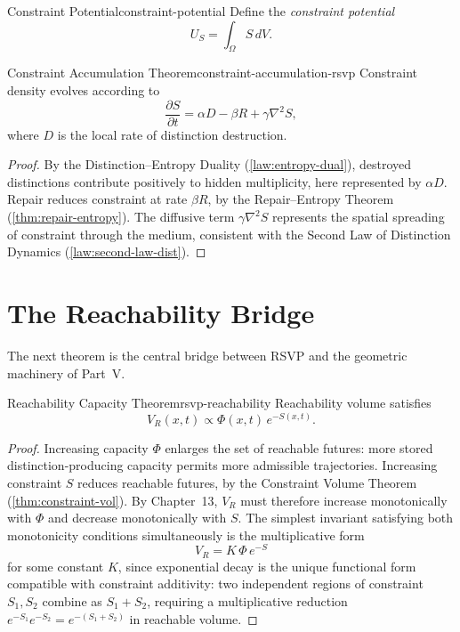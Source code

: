 \documentclass[12pt,twoside,openright]{book}
\begin{document}
\begin{definition}{Constraint Potential}{constraint-potential}
  Define the \emph{constraint potential}
  \[
    U_S = \int_\Omega S \, dV.
  \]
\end{definition}

\begin{theorem}{Constraint Accumulation Theorem}{constraint-accumulation-rsvp}
  Constraint density evolves according to
  \[
    \frac{\partial S}{\partial t}
    = \alpha D - \beta R + \gamma \nabla^2 S,
  \]
  where $D$ is the local rate of distinction destruction.
\end{theorem}

\begin{proof}
  By the Distinction--Entropy Duality
  (\cref{law:entropy-dual}), destroyed distinctions
  contribute positively to hidden multiplicity, here
  represented by $\alpha D$. Repair reduces constraint at
  rate $\beta R$, by the Repair--Entropy Theorem
  (\cref{thm:repair-entropy}). The diffusive term
  $\gamma\nabla^2 S$ represents the spatial spreading of
  constraint through the medium, consistent with the
  Second Law of Distinction Dynamics
  (\cref{law:second-law-dist}).
\end{proof}

\section{The Reachability Bridge}
\label{sec:ch16-bridge}

The next theorem is the central bridge between RSVP and the
geometric machinery of Part~V.

\begin{theorem}{Reachability Capacity Theorem}{rsvp-reachability}
  Reachability volume satisfies
  \[
    V_R(x,t) \propto \Phi(x,t)\, e^{-S(x,t)}.
  \]
\end{theorem}

\begin{proof}
  Increasing capacity $\Phi$ enlarges the set of reachable
  futures: more stored distinction-producing capacity
  permits more admissible trajectories. Increasing
  constraint $S$ reduces reachable futures, by the
  Constraint Volume Theorem (\cref{thm:constraint-vol}).
  By Chapter~13, $V_R$ must therefore increase monotonically
  with $\Phi$ and decrease monotonically with $S$. The
  simplest invariant satisfying both monotonicity
  conditions simultaneously is the multiplicative form
  \[
    V_R = K\, \Phi\, e^{-S}
  \]
  for some constant $K$, since exponential decay is the
  unique functional form compatible with constraint
  additivity: two independent regions of constraint
  $S_1, S_2$ combine as $S_1 + S_2$, requiring a
  multiplicative reduction $e^{-S_1}e^{-S_2} = e^{-(S_1+S_2)}$
  in reachable volume.
\end{proof}
\end{document}
